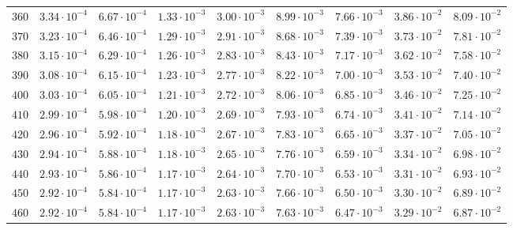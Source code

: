 \begin{landscape}
\begin{table}
\begin{tabular}{lcccccccc}
$	360	$ & $	3.34 \cdot 10^{-4}	$ & $	6.67 \cdot 10^{-4}	$ & $	1.33 \cdot 10^{-3}	$ & $	3.00 \cdot 10^{-3}	$ & $	8.99 \cdot 10^{-3}	$ & $	7.66 \cdot 10^{-3}	$ & $	3.86 \cdot 10^{-2}	$ & $	8.09 \cdot 10^{-2}	 $ \\
$	370	$ & $	3.23 \cdot 10^{-4}	$ & $	6.46 \cdot 10^{-4}	$ & $	1.29 \cdot 10^{-3}	$ & $	2.91 \cdot 10^{-3}	$ & $	8.68 \cdot 10^{-3}	$ & $	7.39 \cdot 10^{-3}	$ & $	3.73 \cdot 10^{-2}	$ & $	7.81 \cdot 10^{-2}	 $ \\
$	380	$ & $	3.15 \cdot 10^{-4}	$ & $	6.29 \cdot 10^{-4}	$ & $	1.26 \cdot 10^{-3}	$ & $	2.83 \cdot 10^{-3}	$ & $	8.43 \cdot 10^{-3}	$ & $	7.17 \cdot 10^{-3}	$ & $	3.62 \cdot 10^{-2}	$ & $	7.58 \cdot 10^{-2}	 $ \\
$	390	$ & $	3.08 \cdot 10^{-4}	$ & $	6.15 \cdot 10^{-4}	$ & $	1.23 \cdot 10^{-3}	$ & $	2.77 \cdot 10^{-3}	$ & $	8.22 \cdot 10^{-3}	$ & $	7.00 \cdot 10^{-3}	$ & $	3.53 \cdot 10^{-2}	$ & $	7.40 \cdot 10^{-2}	 $ \\
$	400	$ & $	3.03 \cdot 10^{-4}	$ & $	6.05 \cdot 10^{-4}	$ & $	1.21 \cdot 10^{-3}	$ & $	2.72 \cdot 10^{-3}	$ & $	8.06 \cdot 10^{-3}	$ & $	6.85 \cdot 10^{-3}	$ & $	3.46 \cdot 10^{-2}	$ & $	7.25 \cdot 10^{-2}	 $ \\
$	410	$ & $	2.99 \cdot 10^{-4}	$ & $	5.98 \cdot 10^{-4}	$ & $	1.20 \cdot 10^{-3}	$ & $	2.69 \cdot 10^{-3}	$ & $	7.93 \cdot 10^{-3}	$ & $	6.74 \cdot 10^{-3}	$ & $	3.41 \cdot 10^{-2}	$ & $	7.14 \cdot 10^{-2}	 $ \\
$	420	$ & $	2.96 \cdot 10^{-4}	$ & $	5.92 \cdot 10^{-4}	$ & $	1.18 \cdot 10^{-3}	$ & $	2.67 \cdot 10^{-3}	$ & $	7.83 \cdot 10^{-3}	$ & $	6.65 \cdot 10^{-3}	$ & $	3.37 \cdot 10^{-2}	$ & $	7.05 \cdot 10^{-2}	 $ \\
$	430	$ & $	2.94 \cdot 10^{-4}	$ & $	5.88 \cdot 10^{-4}	$ & $	1.18 \cdot 10^{-3}	$ & $	2.65 \cdot 10^{-3}	$ & $	7.76 \cdot 10^{-3}	$ & $	6.59 \cdot 10^{-3}	$ & $	3.34 \cdot 10^{-2}	$ & $	6.98 \cdot 10^{-2}	 $ \\
$	440	$ & $	2.93 \cdot 10^{-4}	$ & $	5.86 \cdot 10^{-4}	$ & $	1.17 \cdot 10^{-3}	$ & $	2.64 \cdot 10^{-3}	$ & $	7.70 \cdot 10^{-3}	$ & $	6.53 \cdot 10^{-3}	$ & $	3.31 \cdot 10^{-2}	$ & $	6.93 \cdot 10^{-2}	 $ \\
$	450	$ & $	2.92 \cdot 10^{-4}	$ & $	5.84 \cdot 10^{-4}	$ & $	1.17 \cdot 10^{-3}	$ & $	2.63 \cdot 10^{-3}	$ & $	7.66 \cdot 10^{-3}	$ & $	6.50 \cdot 10^{-3}	$ & $	3.30 \cdot 10^{-2}	$ & $	6.89 \cdot 10^{-2}	 $ \\
$	460	$ & $	2.92 \cdot 10^{-4}	$ & $	5.84 \cdot 10^{-4}	$ & $	1.17 \cdot 10^{-3}	$ & $	2.63 \cdot 10^{-3}	$ & $	7.63 \cdot 10^{-3}	$ & $	6.47 \cdot 10^{-3}	$ & $	3.29 \cdot 10^{-2}	$ & $	6.87 \cdot 10^{-2}	 $ \\

\end{tabular}
\end{table}
\end{landscape}
